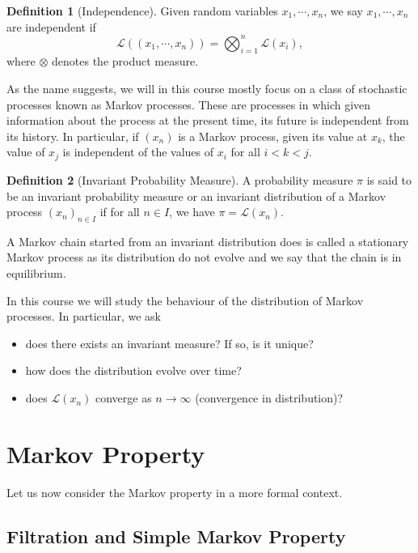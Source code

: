 \documentclass[]{article}
\theoremstyle{definition}
\theoremstyle{definition}
\newtheorem{definition}{Definition}[section]
\begin{document}
\begin{definition}[Independence]
  Given random variables \(x_1, \cdots, x_n\), we say \(x_1, \cdots, x_n\) are 
  independent if 
  \[\mathcal{L}((x_1, \cdots, x_n)) = \bigotimes_{i = 1}^n \mathcal{L}(x_i),\]
  where \(\otimes\) denotes the product measure.
\end{definition}

As the name suggests, we will in this course mostly focus on a class of stochastic 
processes known as Markov processes. These are processes in which given information 
about the process at the present time, its future is independent from its 
history. In particular, if \((x_n)\) is a Markov process, given its value at 
\(x_k\), the value of \(x_j\) is independent of the values of \(x_i\) for all 
\(i < k < j\).

\begin{definition}[Invariant Probability Measure]
  A probability measure \(\pi\) is said to be an invariant probability measure 
  or an invariant distribution of a Markov process \((x_n)_{n \in I}\) if for all 
  \(n \in I\), we have \(\pi = \mathcal{L}(x_n)\).
\end{definition}

A Markov chain started from an invariant distribution does is called a 
stationary Markov process as its distribution do not evolve and we say that the 
chain is in equilibrium.

In this course we will study the behaviour of the distribution of Markov processes. 
In particular, we ask
\begin{itemize}
  \item does there exists an invariant measure? If so, is it unique?
  \item how does the distribution evolve over time?
  \item does \(\mathcal{L}(x_n)\) converge as \(n \to \infty\) 
    (convergence in distribution)?
\end{itemize}

\newpage
\section{Markov Property}

Let us now consider the Markov property in a more formal context.

\subsection{Filtration and Simple Markov Property}
\end{document}
